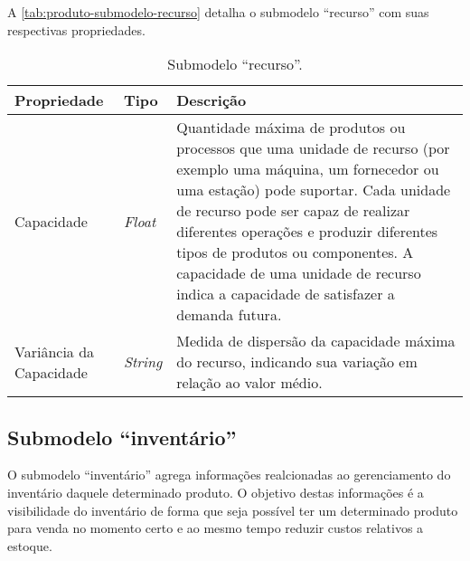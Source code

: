 A \autoref{tab:produto-submodelo-recurso} detalha o submodelo ``recurso'' com suas respectivas propriedades.

\begin{table}[htb]
	\centering
	\caption{Submodelo ``recurso''.}
	\begin{tabular}{p{3.5cm}p{1.5cm}p{9cm}}
		\hline
		\textbf{Propriedade}
		 & \textbf{Tipo}
		 & \textbf{Descrição}                                                                                                                                                                                                                                                                                                                                                      \\

		\hline
		Capacidade
		 & \textit{Float}
		 & Quantidade máxima de produtos ou processos que uma unidade de recurso (por exemplo uma máquina, um fornecedor ou uma estação) pode suportar. Cada unidade de recurso pode ser capaz de realizar diferentes operações e produzir diferentes tipos de produtos ou componentes. A capacidade de uma unidade de recurso indica a capacidade de satisfazer a demanda futura. \\

		\hline
		Variância da Capacidade
		 & \textit{String}
		 & Medida de dispersão da capacidade máxima do recurso, indicando sua variação em relação ao valor médio.                                                                                                                                                                                                                                                                  \\

		\hline
	\end{tabular}
	\label{tab:produto-submodelo-recurso}
\end{table}

\subsection{Submodelo ``inventário''}

O submodelo ``inventário'' agrega informações realcionadas ao gerenciamento do inventário daquele determinado produto.  O objetivo destas informações é a visibilidade do inventário de forma que seja possível ter um determinado produto para venda no momento certo e ao mesmo tempo reduzir custos relativos a estoque.

